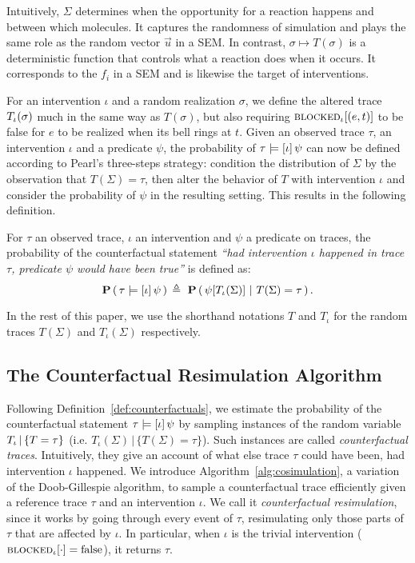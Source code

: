 Intuitively, $\Sigma$ determines when the opportunity for a reaction
happens and between which molecules. It captures the randomness of
simulation and plays the same role as the random vector $\vec u$ in a
SEM. In contrast, $\sigma \mapsto T(\sigma)$ is a deterministic
function that controls what a reaction does when it occurs.  It
corresponds to the $f_i$ in a SEM and is likewise the target of
interventions.


For an intervention $\iota$ and a random realization $\sigma$, we
define the altered trace ${T_\iota}{}(\sigma)$ much in the same way as
$T(\sigma)$, but also requiring ${\textsc{blocked}}_{\iota}[(e, t)]$ to be false
for $e$ to be realized when its bell rings at $t$.  Given an observed
trace $\tau$, an intervention $\iota$ and a predicate $\psi$, the
probability of $\tau \models [\iota] \, \psi{}$ can now be defined according to Pearl's
three-steps strategy: \ItAbduction{} condition the distribution of
$\Sigma$ by the observation that $T(\Sigma)\!=\!\tau$, then
\ItAction{} alter the behavior of $T$  with intervention
$\iota$ and \ItPrediction{} consider the probability of $\psi$ in the
resulting setting. This results in the following definition.

\begin{definition}
\label{def:counterfactuals}
  For $\tau$ an observed trace, $\iota$ an intervention and $\psi$ a
  predicate on traces, the probability of the counterfactual statement
  \textit{``had intervention $\iota$ happened in trace $\tau$,
    predicate $\psi$ would have been true''} is defined as:
  \[ \mathbf{P} \left(\, \tau \models [\iota] \, \psi{} \,\right){} \triangleq 
    \ \mathbf{P} \left(\, \psi[{T_\iota}{}(\Sigma)] \ | \ T(\Sigma) = \tau \,\right). \]
\end{definition}
In the rest of this paper, we use the shorthand notations $T$ and
$T_\iota$ for the random traces $T(\Sigma)$ and $T_\iota(\Sigma)$
respectively.

\subsection{The Counterfactual Resimulation Algorithm}
\label{subsec:cosim-algo}

Following Definition~\ref{def:counterfactuals}, we estimate the
probability of the counterfactual statement $\tau \models [\iota] \, \psi{}$ by sampling
instances of the random variable ${T_\iota\,|\,\{T=\tau\}}{}$ 
(i.e. $T_\iota(\Sigma) \,|\, \{ T(\Sigma) = \tau \}$). 
Such instances are called
\emph{counterfactual traces}. Intuitively, they give an account of
what else trace $\tau$ could have been, had intervention $\iota$
happened.  We introduce Algorithm~\ref{alg:cosimulation}, a variation
of the Doob-Gillespie algorithm, to sample a counterfactual trace
efficiently given a reference trace $\tau$ and an intervention
$\iota$. We call it \emph{counterfactual resimulation}, since it works
by going through every event of $\tau$, resimulating only those parts
of $\tau$ that are affected by $\iota$. In particular, when $\iota$ is
the trivial intervention (${\textsc{blocked}}_{\iota}[\cdot] = \text{false}$), it
returns $\tau$.

